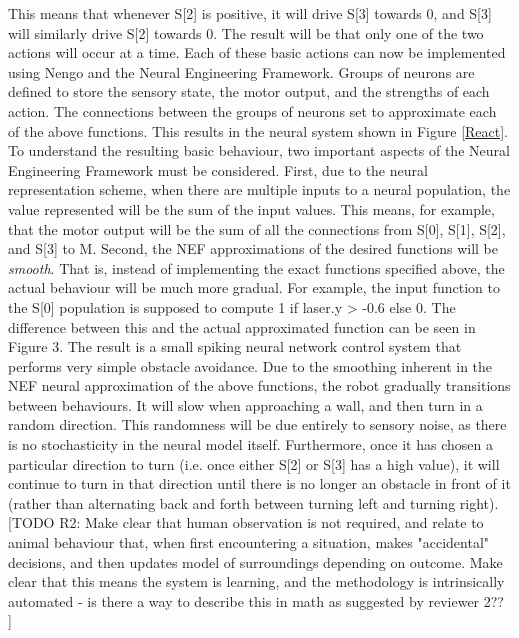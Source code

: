 \documentclass[conference]{IEEEtran}
\begin{document}
This means that whenever S[2] is positive, it will drive
S[3] towards 0, and S[3] will similarly drive S[2] towards 0.
The result will be that only one of the two actions will occur
at a time.
Each of these basic actions can now be implemented
using Nengo and the Neural Engineering Framework.
Groups of neurons are defined to store the sensory state, the
motor output, and the strengths of each action. The
connections between the groups of neurons set to
approximate each of the above functions. This results in the
neural system shown in Figure \ref{React}.
To understand the resulting basic behaviour, two important
aspects of the Neural Engineering Framework must be
considered. First, due to the neural representation scheme,
when there are multiple inputs to a neural population, the
value represented will be the sum of the input values. This
means, for example, that the motor output will be the sum
of all the connections from S[0], S[1], S[2], and S[3] to M.
Second, the NEF approximations of the desired functions
will be \textit{smooth}. That is, instead of implementing the exact
functions specified above, the actual behaviour will be much more gradual. For example, the input function to the S[0]
population is supposed to compute 1 if laser.y > -0.6
else 0. The difference between this and the actual
approximated function can be seen in Figure 3.
The result is a small spiking neural network control
system that performs very simple obstacle avoidance. Due
to the smoothing inherent in the NEF neural approximation
of the above functions, the robot gradually transitions
between behaviours. It will slow when approaching a wall,
and then turn in a random direction. This randomness will
be due entirely to sensory noise, as there is no stochasticity
in the neural model itself. Furthermore, once it has chosen
a particular direction to turn (i.e. once either S[2] or S[3] has a high value), it will continue to turn in that direction
until there is no longer an obstacle in front of it (rather than alternating back and forth between turning left and turning right). [TODO R2: Make clear that human observation is not required, and relate to animal behaviour that, when first encountering a situation, makes "accidental" decisions, and then updates model of surroundings depending on outcome. Make clear that this means the system is learning, and the methodology is intrinsically automated - is there a way to describe this in math as suggested by reviewer 2?? ]
\end{document}
